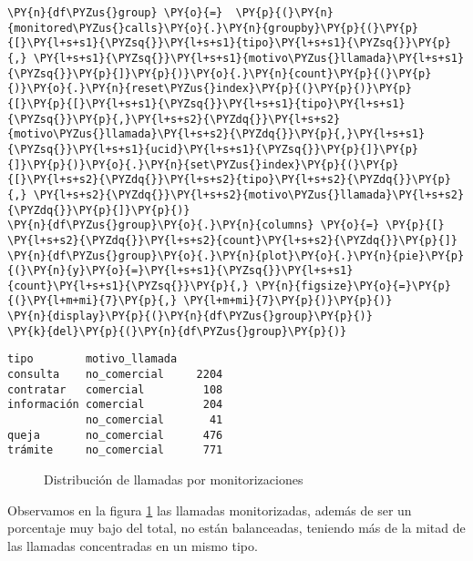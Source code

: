     \begin{tcolorbox}[breakable, size=fbox, boxrule=1pt, pad at break*=1mm,colback=cellbackground, colframe=cellborder]
\begin{Verbatim}[commandchars=\\\{\}]
\PY{n}{df\PYZus{}group} \PY{o}{=}  \PY{p}{(}\PY{n}{monitored\PYZus{}calls}\PY{o}{.}\PY{n}{groupby}\PY{p}{(}\PY{p}{[}\PY{l+s+s1}{\PYZsq{}}\PY{l+s+s1}{tipo}\PY{l+s+s1}{\PYZsq{}}\PY{p}{,} \PY{l+s+s1}{\PYZsq{}}\PY{l+s+s1}{motivo\PYZus{}llamada}\PY{l+s+s1}{\PYZsq{}}\PY{p}{]}\PY{p}{)}\PY{o}{.}\PY{n}{count}\PY{p}{(}\PY{p}{)}\PY{o}{.}\PY{n}{reset\PYZus{}index}\PY{p}{(}\PY{p}{)}\PY{p}{[}\PY{p}{[}\PY{l+s+s1}{\PYZsq{}}\PY{l+s+s1}{tipo}\PY{l+s+s1}{\PYZsq{}}\PY{p}{,}\PY{l+s+s2}{\PYZdq{}}\PY{l+s+s2}{motivo\PYZus{}llamada}\PY{l+s+s2}{\PYZdq{}}\PY{p}{,}\PY{l+s+s1}{\PYZsq{}}\PY{l+s+s1}{ucid}\PY{l+s+s1}{\PYZsq{}}\PY{p}{]}\PY{p}{]}\PY{p}{)}\PY{o}{.}\PY{n}{set\PYZus{}index}\PY{p}{(}\PY{p}{[}\PY{l+s+s2}{\PYZdq{}}\PY{l+s+s2}{tipo}\PY{l+s+s2}{\PYZdq{}}\PY{p}{,} \PY{l+s+s2}{\PYZdq{}}\PY{l+s+s2}{motivo\PYZus{}llamada}\PY{l+s+s2}{\PYZdq{}}\PY{p}{]}\PY{p}{)}
\PY{n}{df\PYZus{}group}\PY{o}{.}\PY{n}{columns} \PY{o}{=} \PY{p}{[} \PY{l+s+s2}{\PYZdq{}}\PY{l+s+s2}{count}\PY{l+s+s2}{\PYZdq{}}\PY{p}{]}
\PY{n}{df\PYZus{}group}\PY{o}{.}\PY{n}{plot}\PY{o}{.}\PY{n}{pie}\PY{p}{(}\PY{n}{y}\PY{o}{=}\PY{l+s+s1}{\PYZsq{}}\PY{l+s+s1}{count}\PY{l+s+s1}{\PYZsq{}}\PY{p}{,} \PY{n}{figsize}\PY{o}{=}\PY{p}{(}\PY{l+m+mi}{7}\PY{p}{,} \PY{l+m+mi}{7}\PY{p}{)}\PY{p}{)}
\PY{n}{display}\PY{p}{(}\PY{n}{df\PYZus{}group}\PY{p}{)}
\PY{k}{del}\PY{p}{(}\PY{n}{df\PYZus{}group}\PY{p}{)}
\end{Verbatim}
\end{tcolorbox}
    \begin{verbatim}
tipo        motivo_llamada       
consulta    no_comercial     2204
contratar   comercial         108
información comercial         204
            no_comercial       41
queja       no_comercial      476
trámite     no_comercial      771
    \end{verbatim}

    
      
\begin{figure}[!ht]
	\centering
    \caption{Distribución de llamadas por monitorizaciones}
    \label{fig:distmoni}
\end{figure}
    
 Observamos en la figura \ref{fig:distmoni} las llamadas monitorizadas, además de ser un porcentaje muy bajo del total, no están balanceadas, teniendo más de la mitad de las llamadas concentradas en un mismo tipo. 
 
